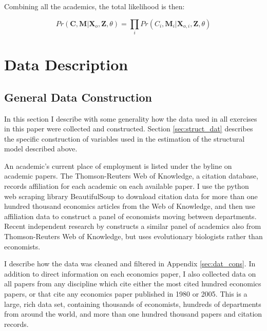 Combining all the academics, the total likelihood is then:

\begin{equation}
    Pr(\mathbf{C},\mathbf{M}|\mathbf{X}_o,\mathbf{Z},\theta) = \prod_i Pr(C_i,\mathbf{M}_i|\mathbf{X}_{o,i}, \mathbf{Z}, \theta)
    \label{eq:fulllik}
\end{equation}

\section{Data Description}
\label{sec:dat}

\subsection{General Data Construction}

In this section I describe with some generality how the data used in all
exercises in this paper were collected and constructed.  Section
\ref{sec:struct_dat} describes the specific construction of variables
used in the estimation of the structural model described above.

An academic's current place of employment is listed under the byline on
academic papers. The Thomson-Reuters Web of Knowledge, a citation
database, records affiliation for each academic on each available paper. I use the
python web scraping library BeautifulSoup to download citation data for
more than one hundred thousand economics articles from the Web of
Knowledge, and then use affiliation data to construct a panel of
economists moving between departments. Recent independent research by
\citet{agrawal2013why} constructs a similar panel of academics also from
Thomson-Reuters Web of Knowledge, but uses evolutionary biologists rather than economists.

I describe how the data was cleaned and filtered in
Appendix \ref{sec:dat_cons}. In addition to direct information on each economics paper, I
also collected data on all papers from any discipline which cite either the
most cited hundred economics papers, or that cite any economics paper
published in 1980 or 2005.\footnotemark{}  This is a large, rich data set, containing thousands
of economists, hundreds of departments from around the world, and more than 
one hundred thousand papers and citation records.

